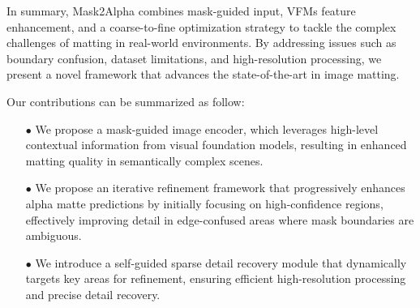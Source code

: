 In summary, Mask2Alpha combines mask-guided input, VFMs feature enhancement, and a coarse-to-fine optimization strategy to tackle the complex challenges of matting in real-world environments. By addressing issues such as boundary confusion, dataset limitations, and high-resolution processing, we present a novel framework that advances the state-of-the-art in image matting.

Our contributions can be summarized as follow:

\begin{itemize} \item[$\bullet$] We propose a mask-guided image encoder, which leverages high-level contextual information from visual foundation models, resulting in enhanced matting quality in semantically complex scenes.

\item[$\bullet$] We propose an iterative refinement framework that progressively enhances alpha matte predictions by initially focusing on high-confidence regions, effectively improving detail in edge-confused areas where mask boundaries are ambiguous.

\item[$\bullet$] We introduce a self-guided sparse detail recovery module that dynamically targets key areas for refinement, ensuring efficient high-resolution processing and precise detail recovery. 
\end{itemize}

